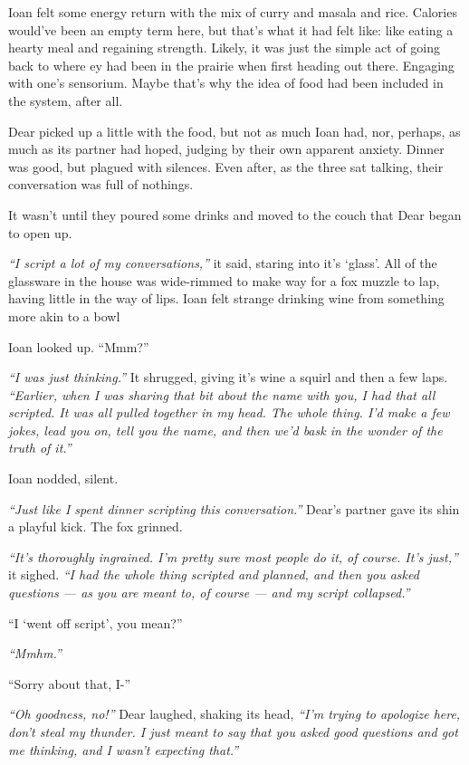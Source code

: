 Ioan felt some energy return with the mix of curry and masala and rice. Calories would've been an empty term here, but that's what it had felt like: like eating a hearty meal and regaining strength. Likely, it was just the simple act of going back to where ey had been in the prairie when first heading out there. Engaging with one's sensorium. Maybe that's why the idea of food had been included in the system, after all.

Dear picked up a little with the food, but not as much Ioan had, nor, perhaps, as much as its partner had hoped, judging by their own apparent anxiety. Dinner was good, but plagued with silences. Even after, as the three sat talking, their conversation was full of nothings.

It wasn't until they poured some drinks and moved to the couch that Dear began to open up.

\emph{``I script a lot of my conversations,''} it said, staring into it's `glass'. All of the glassware in the house was wide-rimmed to make way for a fox muzzle to lap, having little in the way of lips. Ioan felt strange drinking wine from something more akin to a bowl

Ioan looked up. ``Mmm?''

\emph{``I was just thinking.''} It shrugged, giving it's wine a squirl and then a few laps. \emph{``Earlier, when I was sharing that bit about the name with you, I had that all scripted. It was all pulled together in my head. The whole thing. I'd make a few jokes, lead you on, tell you the name, and then we'd bask in the wonder of the truth of it.''}

Ioan nodded, silent.

\emph{``Just like I spent dinner scripting this conversation.''} Dear's partner gave its shin a playful kick. The fox grinned.

\emph{``It's thoroughly ingrained. I'm pretty sure most people do it, of course. It's just,''} it sighed. \emph{``I had the whole thing scripted and planned, and then you asked questions --- as you are meant to, of course --- and my script collapsed.''}

``I `went off script', you mean?''

\emph{``Mmhm.''}

``Sorry about that, I-''

\emph{``Oh goodness, no!''} Dear laughed, shaking its head, \emph{``I'm trying to apologize here, don't steal my thunder. I just meant to say that you asked good questions and got me thinking, and I wasn't expecting that.''}


